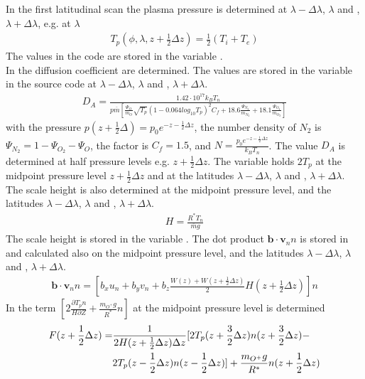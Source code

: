 %
In the first latitudinal scan the plasma pressure is determined at
$\lambda - \Delta \lambda$, $\lambda$ and , $\lambda + \Delta
\lambda$, e.g. at $\lambda$
%
\begin{align}
  T_p(\phi,\lambda, z+\frac{1}{2}\Delta z) = \frac{1}{2} (T_i + T_e)
\end{align}
%
The values in the code are stored in the variable . \\

%
In  the diffusion coefficient are determined.
The values are stored in the variable  in the source code at
$\lambda - \Delta \lambda$, $\lambda$ and , $\lambda + \Delta
\lambda$.
%
\begin{align}
  D_A = \frac{1.42 \cdot 10^{17} k_B T_n}
  {p \overline{m}\left[
    \frac{\Psi_O}{m_O} \sqrt{T_p}(1-0.064 log_{10} T_p)^2 C_f + 18.6 \frac{\Psi_{N_2}}{m_{N_2}}
    + 18.1 \frac{\Psi_{O_2}}{m_{O_2}}\right]}
\end{align}
%
with the pressure $p(z + \frac{1}{2}\Delta ) = p_0 e^{-z -
\frac{1}{2}\Delta z}$, the number density of $N_2$ is $\Psi_{N_2}= 1
- \Psi_{O_2}-\Psi_O$, the factor is $C_f = 1.5$, and $N = \frac{p_0
e^{-z - \frac{1}{2}\Delta z}}{k_B T_n}$. The value $D_A$ is
determined at half pressure levels e.g. $z + \frac{1}{2} \Delta z$.
%
The variable  holds $2 T_p$ at the midpoint pressure level
$z + \frac{1}{2} \Delta z$ and at the latitudes $\lambda - \Delta
\lambda$, $\lambda$ and , $\lambda + \Delta \lambda$. The scale
height is also determined at the midpoint pressure level, and the
latitudes $\lambda - \Delta \lambda$, $\lambda$ and , $\lambda +
\Delta \lambda$.
%
\begin{align}
  H = \frac{R^* T_n}{\overline{m} g}
\end{align}
%
The scale height is stored in the variable . The dot product
$\mathbf{b} \cdot \mathbf{v}_n n$ is stored in  and
calculated also on the midpoint pressure level, and the latitudes
$\lambda - \Delta \lambda$, $\lambda$ and , $\lambda + \Delta
\lambda$.
%
\begin{align}
   \mathbf{b} \cdot \mathbf{v}_n n = \left[  b_x u_n + b_y v_n + b_z
      \frac{W(z) + W(z+\frac{1}{2} \Delta z)}{2} H(z+\frac{1}{2} \Delta
      z)\right]n
\end{align}
%
In  the term $ \left[2 \frac{\partial T_p
n}{H
\partial Z} + \frac{m_{O^+}  g}{R^*}n \right] $ at the midpoint
pressure level is determined
%
\begin{align}
 F(z+\frac{1}{2}\Delta z) =  & \frac{1}{2 H(z+\frac{1}{2}\Delta z) \Delta z}[2 T_p(z+\frac{3}{2}\Delta
 z)n(z+\frac{3}{2}\Delta z) - \notag \\
 {} & 2 T_p(z-\frac{1}{2}\Delta z)n(z-\frac{1}{2}\Delta z)
 ] + \frac{m_{O^+}  g}{R^*}  n(z+\frac{1}{2}\Delta z)
 \label{eq:oplus_F}
\end{align}
